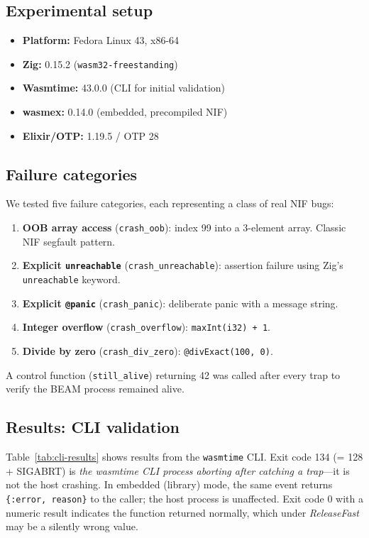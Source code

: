 \documentclass[11pt,a4paper]{article}
\begin{document}
\subsection{Experimental setup}

\begin{itemize}
  \item \textbf{Platform:} Fedora Linux 43, x86-64
  \item \textbf{Zig:} 0.15.2 (\texttt{wasm32-freestanding})
  \item \textbf{Wasmtime:} 43.0.0 (CLI for initial validation)
  \item \textbf{wasmex:} 0.14.0 (embedded, precompiled NIF)
  \item \textbf{Elixir/OTP:} 1.19.5 / OTP 28
\end{itemize}

\subsection{Failure categories}

We tested five failure categories, each representing a class of real NIF bugs:

\begin{enumerate}
  \item \textbf{OOB array access} (\texttt{crash\_oob}): index 99 into a
        3-element array. Classic NIF segfault pattern.
  \item \textbf{Explicit \texttt{unreachable}} (\texttt{crash\_unreachable}):
        assertion failure using Zig's \texttt{unreachable} keyword.
  \item \textbf{Explicit \texttt{@panic}} (\texttt{crash\_panic}): deliberate
        panic with a message string.
  \item \textbf{Integer overflow} (\texttt{crash\_overflow}):
        \texttt{maxInt(i32) + 1}.
  \item \textbf{Divide by zero} (\texttt{crash\_div\_zero}):
        \texttt{@divExact(100, 0)}.
\end{enumerate}

A control function (\texttt{still\_alive}) returning 42 was called after every
trap to verify the BEAM process remained alive.

\subsection{Results: CLI validation}
\label{sec:cli-results}

Table~\ref{tab:cli-results} shows results from the \texttt{wasmtime} CLI.
Exit code 134 (= 128 + SIGABRT) is \textit{the wasmtime CLI process aborting
after catching a trap}---it is not the host crashing. In embedded (library)
mode, the same event returns \texttt{\{:error, reason\}} to the caller; the
host process is unaffected. Exit code 0 with a numeric result indicates the
function returned normally, which under \textit{ReleaseFast} may be a silently
wrong value.
\end{document}

